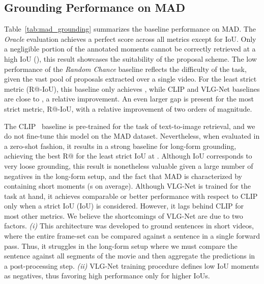\documentclass[10pt,twocolumn,letterpaper]{article}
\begin{document}
\subsection{Grounding Performance on MAD}
Table~\ref{tab:mad_grounding} summarizes the baseline performance on MAD. The  \textit{Oracle} evaluation achieves a perfect score across all metrics except for IoU. Only a negligible portion of the annotated moments cannot be correctly retrieved at a high IoU (), this result showcases the suitability of the proposal scheme. The low performance of the \textit{Random Chance} baseline  reflects the difficulty of the task, given the vast pool of proposals extracted over a single video. For the least strict metric (R@-IoU), this baseline only achieves  , while CLIP and VLG-Net baselines are close to , a  relative improvement. An even larger gap is present for the most strict metric, R@-IoU, with a relative improvement of two orders of magnitude.

The CLIP~\cite{radford2021learning} baseline is pre-trained for the task of text-to-image retrieval, and we do not fine-tune this model on the MAD dataset. Nevertheless, when evaluated in a zero-shot fashion, it results in a strong baseline for long-form grounding, achieving the best R@ for the least strict IoU at . Although IoU corresponds to very loose grounding, this result is nonetheless valuable given a large number of negatives in the long-form setup, and the fact that MAD is characterized by containing short moments (s on average). Although VLG-Net is trained for the task at hand, it achieves comparable or better performance with respect to CLIP only when a strict IoU (IoU) is considered. However, it lags behind CLIP for most other metrics. We believe the shortcomings of VLG-Net are due to two factors. \emph{(i)} This architecture was developed to ground sentences in short videos, where the entire frame-set can be compared against a sentence in a single forward pass. Thus, it struggles in the long-form setup where we must compare the sentence against all segments of the movie and then aggregate the predictions in a post-processing step. \emph{(ii)} VLG-Net training procedure defines low IoU moments as negatives, thus favoring high performance only for higher IoUs. 
\end{document}
